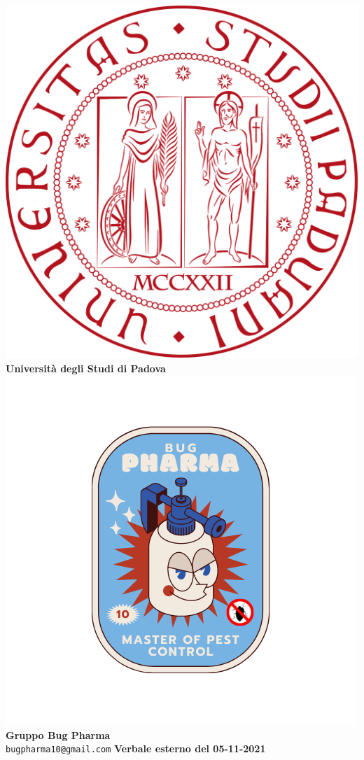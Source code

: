 \documentclass[11pt]{article}
\begin{document}
	\thispagestyle{empty}
	\begin{titlepage}
		\begin{center}
			\includegraphics[scale = 0.05]{../../Res/logo_unipd.png}\\
			\bigskip
			\large \textbf{Università degli Studi di Padova} \\
			\vfill
			\includegraphics[scale = 0.7]{../../Res/BugPharma_Logo.png}\\
			\huge \textbf{Gruppo Bug Pharma} \\
			\vfill
			\large \texttt{bugpharma10@gmail.com}
			\vfill
			\Huge \textbf{Verbale esterno del 05-11-2021}\\
			

\end{center}
\end{titlepage}
\end{document}

